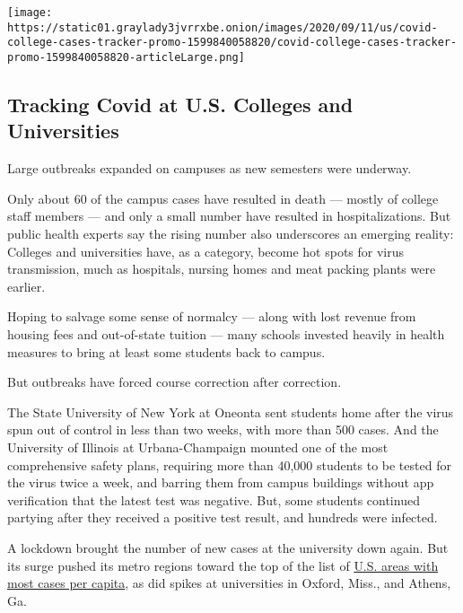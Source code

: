 \href{https://www.nytimes3xbfgragh.onion/interactive/2020/us/covid-college-cases-tracker.html}{}

\texttt{[image: https://static01.graylady3jvrrxbe.onion/images/2020/09/11/us/covid-college-cases-tracker-promo-1599840058820/covid-college-cases-tracker-promo-1599840058820-articleLarge.png]}

\hypertarget{tracking-covid-at-us-colleges-and-universities}{%
\subsection{Tracking Covid at U.S. Colleges and
Universities}\label{tracking-covid-at-us-colleges-and-universities}}

Large outbreaks expanded on campuses as new semesters were underway.

Only about 60 of the campus cases have resulted in death --- mostly of
college staff members --- and only a small number have resulted in
hospitalizations. But public health experts say the rising number also
underscores an emerging reality: Colleges and universities have, as a
category, become hot spots for virus transmission, much as hospitals,
nursing homes and meat packing plants were earlier.

Hoping to salvage some sense of normalcy --- along with lost revenue
from housing fees and out-of-state tuition --- many schools invested
heavily in health measures to bring at least some students back to
campus.

But outbreaks have forced course correction after correction.

The State University of New York at Oneonta sent students home after the
virus spun out of control in less than two weeks, with more than 500
cases. And the University of Illinois at Urbana-Champaign mounted one of
the most comprehensive safety plans, requiring more than 40,000 students
to be tested for the virus twice a week, and barring them from campus
buildings without app verification that the latest test was negative.
But, some students continued partying after they received a positive
test result, and hundreds were infected.

A lockdown brought the number of new cases at the university down again.
But its surge pushed its metro regions toward the top of the list of
\href{https://www.nytimes3xbfgragh.onion/interactive/2020/04/23/upshot/five-ways-to-monitor-coronavirus-outbreak-us.html}{U.S.
areas with most cases per capita}, as did spikes at universities in
Oxford, Miss., and Athens, Ga.

